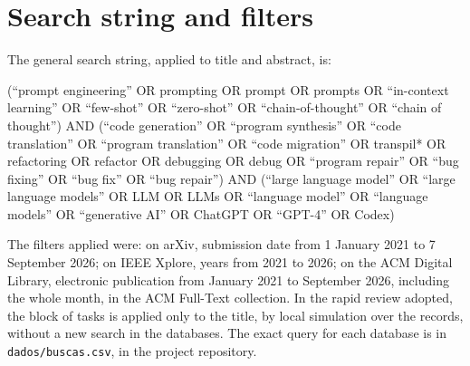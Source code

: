 \appendices
\section{Search string and filters}\label{ap:busca}
The general search string, applied to title and abstract, is:

{\footnotesize\raggedright
(``prompt engineering'' OR prompting OR prompt OR prompts OR ``in-context learning'' OR ``few-shot''
OR ``zero-shot'' OR ``chain-of-thought'' OR ``chain of thought'') AND (``code generation'' OR
``program synthesis'' OR ``code translation'' OR ``program translation'' OR ``code migration'' OR
transpil* OR refactoring OR refactor OR debugging OR debug OR ``program repair'' OR ``bug fixing'' OR
``bug fix'' OR ``bug repair'') AND (``large language model'' OR ``large language models'' OR LLM OR
LLMs OR ``language model'' OR ``language models'' OR ``generative AI'' OR ChatGPT OR ``GPT-4'' OR
Codex)\par}

\medskip
The filters applied were: on arXiv, submission date from 1 January 2021 to 7 September 2026; on IEEE Xplore,
years from 2021 to 2026; on the ACM Digital Library, electronic publication from January 2021 to September 2026, including the
whole month, in the ACM Full-Text collection. In the rapid review adopted, the block of tasks is applied only to the
title, by local simulation over the records, without a new search in the databases. The exact query for each database is in \texttt{dados/buscas.csv}, in the project repository.

